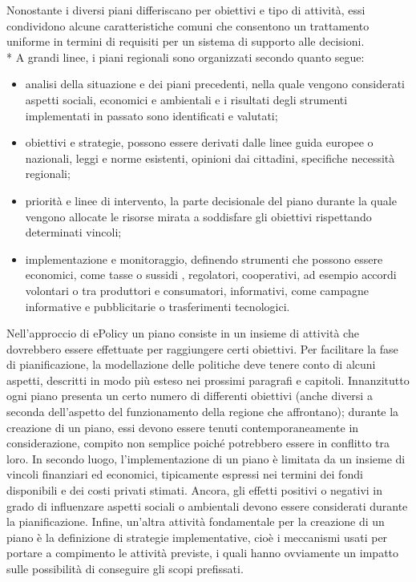 \documentclass[12pt,a4paper,openright,twoside]{report}
\begin{document}
Nonostante i diversi piani differiscano per obiettivi e tipo di attività, essi condividono alcune caratteristiche comuni che consentono un trattamento uniforme in termini di requisiti per un sistema di supporto alle decisioni.\\*
A grandi linee, i piani regionali sono organizzati secondo quanto segue: \begin{itemize}
\item analisi della situazione e dei piani precedenti, nella quale vengono considerati aspetti sociali, economici e ambientali e i risultati degli strumenti implementati in passato sono identificati e valutati;
\item obiettivi e strategie, possono essere derivati dalle linee guida europee o nazionali, leggi e norme esistenti, opinioni dai cittadini, specifiche necessità regionali;
\item priorità e linee di intervento, la parte decisionale del piano durante la quale vengono allocate le risorse mirata a soddisfare gli obiettivi rispettando determinati vincoli;
\item implementazione e monitoraggio, definendo strumenti che possono essere economici, come tasse o sussidi , regolatori, cooperativi, ad esempio accordi volontari o tra produttori e consumatori, informativi, come campagne informative e pubblicitarie o trasferimenti tecnologici.   
\end{itemize}
Nell'approccio di ePolicy un piano consiste in un insieme di attività che dovrebbero essere effettuate per raggiungere certi obiettivi. Per facilitare la fase di pianificazione, la modellazione delle politiche deve tenere conto di alcuni aspetti, descritti in modo più esteso nei prossimi paragrafi e capitoli. Innanzitutto ogni piano presenta un certo numero di differenti obiettivi (anche diversi a seconda dell'aspetto del funzionamento della regione che affrontano); durante la creazione di un piano, essi devono essere tenuti contemporaneamente in considerazione, compito non semplice poiché potrebbero essere in conflitto tra loro. In secondo luogo, l'implementazione di un piano è limitata da un insieme di vincoli finanziari ed economici, tipicamente espressi nei termini dei fondi disponibili e dei costi privati stimati. Ancora, gli effetti positivi o negativi in grado di influenzare aspetti sociali o ambientali devono essere considerati durante la pianificazione. Infine, un'altra attività fondamentale per la creazione di un piano è la definizione di strategie implementative, cioè i meccanismi usati per portare a compimento le attività previste, i quali hanno ovviamente un impatto sulle possibilità di conseguire gli scopi prefissati.
\end{document}
